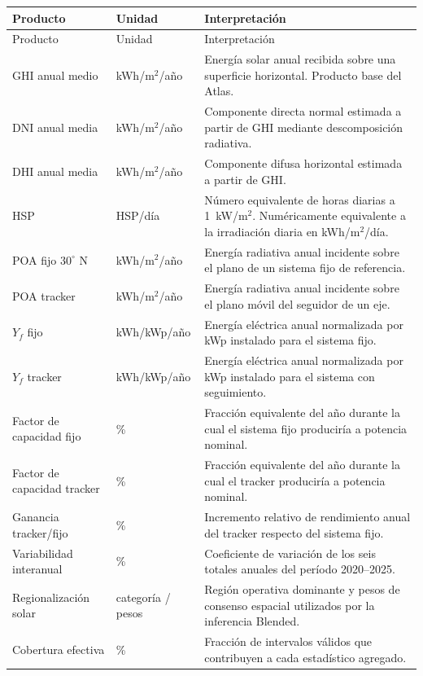 \documentclass[11pt,a4paper]{article}
\begin{document}
\begin{longtable}{p{}p{}p{}}
\toprule
Producto & Unidad & Interpretación \\
\midrule
\endfirsthead
\toprule
Producto & Unidad & Interpretación \\
\midrule
\endhead

GHI anual medio &
kWh/m$^2$/año &
Energía solar anual recibida sobre una superficie horizontal. Producto base del Atlas. \\

DNI anual media &
kWh/m$^2$/año &
Componente directa normal estimada a partir de GHI mediante descomposición radiativa. \\

DHI anual media &
kWh/m$^2$/año &
Componente difusa horizontal estimada a partir de GHI. \\

HSP &
HSP/día &
Número equivalente de horas diarias a 1~kW/m$^2$. Numéricamente equivalente a la irradiación diaria en kWh/m$^2$/día. \\

POA fijo $30^\circ$ N &
kWh/m$^2$/año &
Energía radiativa anual incidente sobre el plano de un sistema fijo de referencia. \\

POA tracker &
kWh/m$^2$/año &
Energía radiativa anual incidente sobre el plano móvil del seguidor de un eje. \\

$Y_f$ fijo &
kWh/kWp/año &
Energía eléctrica anual normalizada por kWp instalado para el sistema fijo. \\

$Y_f$ tracker &
kWh/kWp/año &
Energía eléctrica anual normalizada por kWp instalado para el sistema con seguimiento. \\

Factor de capacidad fijo &
\% &
Fracción equivalente del año durante la cual el sistema fijo produciría a potencia nominal. \\

Factor de capacidad tracker &
\% &
Fracción equivalente del año durante la cual el tracker produciría a potencia nominal. \\

Ganancia tracker/fijo &
\% &
Incremento relativo de rendimiento anual del tracker respecto del sistema fijo. \\

Variabilidad interanual &
\% &
Coeficiente de variación de los seis totales anuales del período 2020--2025. \\

Regionalización solar &
categoría / pesos &
Región operativa dominante y pesos de consenso espacial utilizados por la inferencia Blended. \\

Cobertura efectiva &
\% &
Fracción de intervalos válidos que contribuyen a cada estadístico agregado. \\

\bottomrule
\end{longtable}
\end{document}
